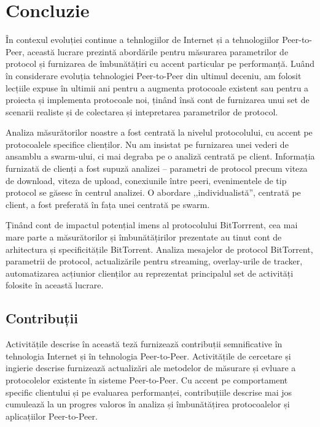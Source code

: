 
\chapter{Concluzie}
\label{chapter:conclusion}

În contexul evoluției continue a tehnlogiilor de Internet și a tehnologiilor
Peer-to-Peer, această lucrare prezintă abordările pentru măsurarea
parametrilor de protocol și furnizarea de îmbunătățiri cu accent particular pe
performanță. Luând în considerare evoluția tehnologiei Peer-to-Peer din
ultimul deceniu, am folosit lecțiile expuse în ultimii ani pentru a augmenta
protocoale existent sau pentru a proiecta și implementa protocoale noi, ținând
însă cont de furnizarea unui set de scenarii realiste și de colectarea și
intepretarea parametrilor de protocol.

Analiza măsurătorilor noastre a fost centrată la nivelul protocolului, cu
accent pe protocoalele specifice clienților. Nu am insistat pe furnizarea unei
vederi de ansamblu a swarm-ului, ci mai degraba pe o analiză centrată pe
client. Informația furnizată de clienți a fost supuză analizei -- parametri de
protocol precum viteza de download, viteza de upload, conexiunile între peeri,
evenimentele de tip protocol se găsesc în centrul analizei. O abordare
,,individualistă'', centrată pe client, a fost preferată în fața unei centrată
pe swarm.

Ținând cont de impactul potențial imens al protocolului BitTorrrent, cea mai
mare parte a măsurătorilor și îmbunătățirilor prezentate au tinut cont de
arhitectura și specificitățile BitTorrent. Analiza mesajelor de protocol
BitTorrent, parametrii de protocol, actualizările pentru streaming,
overlay-urile de tracker, automatizarea acțiunior clienților au reprezentat
principalul set de activități folosite în această lucrare.

\section{Contribuții}
\label{sec:conclusion:contributions}

Activitățile descrise în această teză furnizează contribuții semnificative în
tehnologia Internet și în tehnologia Peer-to-Peer. Activitățile de cercetare
și ingierie descrise furnizează actualizări ale metodelor de măsurare și
evluare a protocolelor existente în sisteme Peer-to-Peer. Cu accent pe
comportament specific clientului și pe evaluarea performanței, contribuțiile
descrise mai jos cumulează la un progres valoros în analiza și îmbunătățirea
protocoalelor și aplicațiilor Peer-to-Peer.

